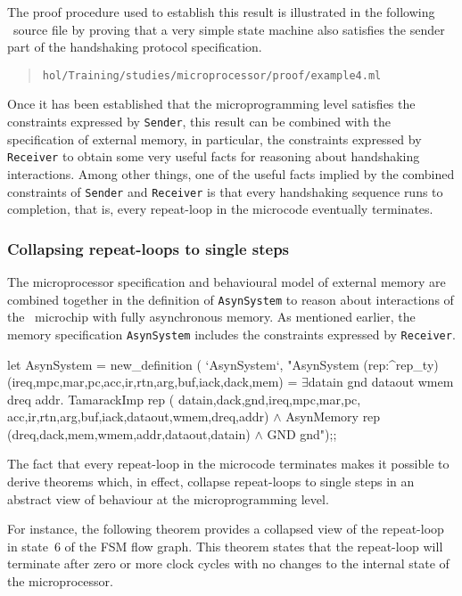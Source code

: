 The proof procedure used to establish this result
is illustrated in the following \HOL\ source file
by proving that a very simple state machine also satisfies the
sender part of the handshaking protocol specification.

\begin{quote}
\verb"hol/Training/studies/microprocessor/proof/example4.ml"
\end{quote}

Once it has been established that the microprogramming level
satisfies the constraints expressed by \verb"Sender",
this result can be combined with the specification of external
memory, in particular, the constraints expressed by \verb"Receiver"
to obtain some very useful facts for reasoning about
handshaking interactions.
Among other things, one of the useful facts implied by
the combined constraints of
\verb"Sender" and \verb"Receiver" is that every handshaking sequence
runs to completion, that is,
every repeat-loop in the microcode eventually terminates.

\subsubsection{Collapsing repeat-loops to single steps}

The microprocessor specification and behavioural model of external
memory are combined together in the definition of \verb"AsynSystem"
to reason about interactions of the \Tamarack\ microchip
with fully asynchronous memory.
As mentioned earlier,
the memory specification \verb"AsynSystem" includes
the constraints
expressed by \verb"Receiver".

\begintt
let AsynSystem = new_definition (
  `AsynSystem`,
  "AsynSystem (rep:^rep_ty)
    (ireq,mpc,mar,pc,acc,ir,rtn,arg,buf,iack,dack,mem) =
    \(\exists\)datain gnd dataout wmem dreq addr.
      TamarackImp rep (
        datain,dack,gnd,ireq,mpc,mar,pc,
        acc,ir,rtn,arg,buf,iack,dataout,wmem,dreq,addr) \(\wedge\)
      AsynMemory rep (dreq,dack,mem,wmem,addr,dataout,datain) \(\wedge\)
      GND gnd");;
\endtt

The fact that every repeat-loop in the microcode terminates
makes it possible to derive theorems
which, in effect, collapse repeat-loops to single steps
in an abstract view of behaviour at the microprogramming level.

For instance, the following theorem
provides a collapsed view of the repeat-loop in state~6
of the FSM flow graph.
This theorem states that the repeat-loop will terminate
after zero or more clock cycles
with no changes to the internal state of the microprocessor.

